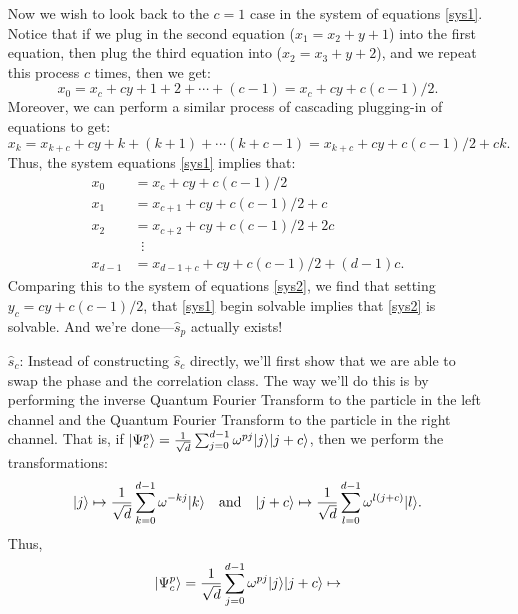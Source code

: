 \begin{enumerate}
Now we wish to look back to the $c=1$ case in the system of equations \eqref{sys1}. Notice that if we plug in the second equation ($x_1 = x_2 + y + 1$) into the first equation, then plug the third equation into ($x_2 = x_3 + y + 2$), and we repeat this process $c$ times, then we get:
\begin{equation}
  x_0 = x_c + cy + 1 + 2 + \cdots + (c-1) = x_c + cy + c(c-1)/2.
\end{equation}
Moreover, we can perform a similar process of cascading plugging-in of equations to get:
\begin{equation}
  x_k = x_{k+c} + cy + k + (k + 1) + \cdots (k + c - 1) = x_{k+c} + cy + c(c-1)/2 + ck.
\end{equation}
Thus, the system equations \eqref{sys1} implies that:
\begin{equation}
\begin{split}
  x_0 &= x_c + cy + c(c-1)/2 \\
  x_1 &= x_{c+1} + cy + c(c-1)/2 + c \\
  x_2 &= x_{c+2} + cy + c(c-1)/2 + 2c \\
  & \; \; \vdots \\
  x_{d-1} &= x_{d-1+c} + cy + c(c-1)/2 + (d-1)c.
\end{split}
\end{equation}
Comparing this to the system of equations \eqref{sys2}, we find that setting $y_c = cy + c(c-1)/2$, that \eqref{sys1} begin solvable implies that \eqref{sys2} is solvable. And we're done---$\hat{s}_p$ actually exists!
  \item[$\hat{s}_c$:] Instead of constructing $\hat{s}_c$ directly, we'll first show that we are able to swap the phase and the correlation class. The way we'll do this is by performing the inverse Quantum Fourier Transform to the particle in the left channel and the Quantum Fourier Transform to the particle in the right channel. That is, if $| \Psi_c^p \rangle = \frac{1}{\sqrt{d}}\sum_{j=0}^{d-1} \omega^{pj} | j \rangle | j+c \rangle$, then we perform the transformations:
  \begin{equation}
    | j \rangle \mapsto \frac{1}{\sqrt{d}} \sum_{k=0}^{d-1} \omega^{-kj} | k \rangle \quad \text{and} \quad | j+c \rangle \mapsto \frac{1}{\sqrt{d}} \sum_{l=0}^{d-1} \omega^{l(j+c)} | l \rangle.
  \end{equation}
  Thus,
  \begin{equation}
    \begin{split}
      \ket{\Psi_c^p} &= \frac{1}{\sqrt{d}}\sum_{j=0}^{d-1} \omega^{pj} \ket{j} \ket{j+c} \mapsto \\

\end{split}
\end{equation}
\end{enumerate}
